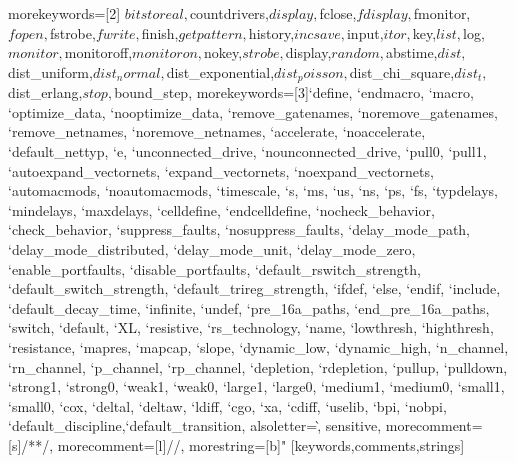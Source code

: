 {	morekeywords=[2]{%
		$bitstoreal,$countdrivers,$display,$fclose,$fdisplay,$fmonitor,$fopen,$fstrobe,$fwrite,$finish,$getpattern,$history,$incsave,$input,$itor,$key,$list,$log,$monitor,$monitoroff,$monitoron,$nokey,$strobe,$display,$random,$abstime,$dist,$dist_uniform,$dist_normal,$dist_exponential,$dist_poisson,$dist_chi_square,$dist_t,$dist_erlang,$stop,$bound_step},%
	morekeywords=[3]{`define, `endmacro, `macro, `optimize_data, `nooptimize_data, `remove_gatenames, `noremove_gatenames, `remove_netnames, `noremove_netnames, `accelerate, `noaccelerate, `default_nettyp, `e, `unconnected_drive, `nounconnected_drive, `pull0, `pull1, `autoexpand_vectornets, `expand_vectornets, `noexpand_vectornets, `automacmods, `noautomacmods, `timescale, `s, `ms, `us, `ns, `ps, `fs, `typdelays, `mindelays, `maxdelays, `celldefine, `endcelldefine, `nocheck_behavior, `check_behavior, `suppress_faults, `nosuppress_faults, `delay_mode_path, `delay_mode_distributed, `delay_mode_unit, `delay_mode_zero, `enable_portfaults, `disable_portfaults, `default_rswitch_strength, `default_switch_strength, `default_trireg_strength, `ifdef, `else, `endif, `include, `default_decay_time, `infinite, `undef, `pre_16a_paths, `end_pre_16a_paths, `switch, `default, `XL, `resistive, `rs_technology, `name, `lowthresh, `highthresh, `resistance, `mapres, `mapcap, `slope, `dynamic_low, `dynamic_high, `n_channel, `rn_channel, `p_channel, `rp_channel, `depletion, `rdepletion, `pullup, `pulldown, `strong1, `strong0, `weak1, `weak0, `large1, `large0, `medium1, `medium0, `small1, `small0, `cox, `deltal, `deltaw, `ldiff, `cgo, `xa, `cdiff, `uselib, `bpi, `nobpi, `default_discipline,`default_transition},%
	alsoletter=\`,%
	sensitive,%
	morecomment=[s]{/*}{*/},%
	morecomment=[l]//,%
	morestring=[b]"%
	}[keywords,comments,strings]%

